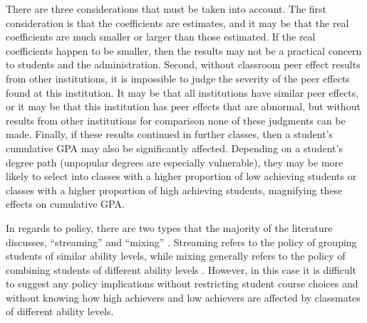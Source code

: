There are three considerations that must be taken into account.
The first consideration is that the coefficients are estimates, and it may be that the real coefficients are much smaller or larger than those estimated. 
If the real coefficients happen to be smaller, then the results may not be a practical concern to students and the administration.
Second, without classroom peer effect results from other institutions, it is impossible to judge the severity of the peer effects found at this institution. 
It may be that all institutions have similar peer effects, or it may be that this institution has peer effects that are abnormal, but without results from other institutions for comparison none of these judgments can be made. 
Finally, if these results continued in further classes, then a student's cumulative GPA may also be significantly affected. 
Depending on a student's degree path (unpopular degrees are especially vulnerable), they may be more likely to select into classes with a higher proportion of low achieving students or classes with a higher proportion of high achieving students, magnifying these effects on cumulative GPA.

In regards to policy, there are two types that the majority of the literature discusses, ``streaming'' and ``mixing'' \citep{ding2007peers,kang2007classroom,carman2012classroom}. 
Streaming refers to the policy of grouping students of similar ability levels, while mixing generally refers to the policy of combining students of different ability levels \citep{ding2007peers}.
However, in this case it is difficult to suggest any policy implications without restricting student course choices and without knowing how high achievers and low achievers are affected by classmates of different ability levels. 

